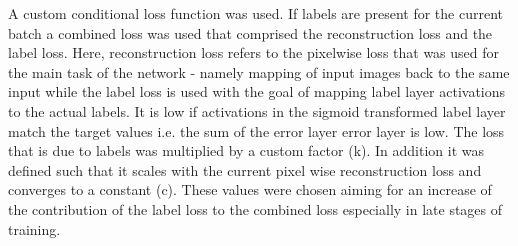 A custom conditional loss function was used. If labels are present for the current batch a combined loss was used that comprised the reconstruction loss and the label loss. Here, reconstruction loss refers to the pixelwise loss that was used for the main task of the network  - namely mapping of input images back to the same input while the label loss is used with the goal of mapping label layer activations to the actual labels. It is low if activations in the sigmoid transformed label layer match the target values i.e. the sum of the error layer error layer is low. The loss that is due to labels was multiplied by a custom factor (k). In addition it was defined such that it scales with the current pixel wise reconstruction loss and converges to a constant (c). These values were chosen aiming for an increase of the contribution of the label loss to the combined loss especially in late stages of training.

